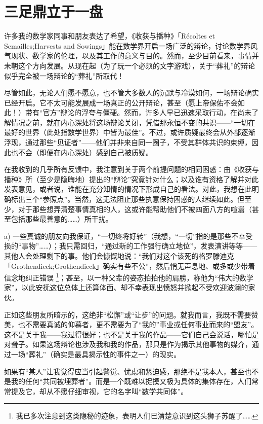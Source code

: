 \section{三足鼎立于一盘}

许多我的数学家同事和朋友表达了希望，《收获与播种》「Récoltes et Semailles;Harvests and Sowings」能在数学界开启一场广泛的辩论，讨论数学界风气现状、数学家的伦理，以及其工作的意义与目的。然而，至少目前看来，事情并未朝这个方向发展。从现在起（为了玩一个必须的文字游戏），关于“葬礼”的辩论似乎完全被一场辩论的“葬礼”所取代！

尽管如此，无论人们愿不愿意，也不管大多数人的沉默与冷漠如何，一场辩论确实已经开启。它不太可能发展成一场真正的公开辩论，甚至（愿上帝保佑不会如此！）带有“官方”辩论的浮夸与僵硬。然而，许多人早已迅速采取行动，在尚未了解情况之前，就在内心深处将这场辩论关闭，凭借那永恒不变的共识——“一切在最好的世界（此处指数学世界）中皆为最佳”。不过，或许质疑最终会从外部逐渐浮现，通过那些“见证者”——他们并非来自同一圈子，不受其群体共识的束缚，因此也不会（即便在内心深处）感到自己被质疑。

在我收到的几乎所有反馈中，我注意到关于两个前提问题的相同困惑：由《收获与播种》所（至少是隐晦地）提出的“辩论”究竟针对什么；以及谁有资格了解并对此发表意见，或者说，谁能在充分知情的情况下形成自己的看法。对此，我想在此明确标出三个“参照点”。当然，这无法阻止那些执意保持困惑的人继续如此。但至少，对于那些想弄清楚事情真相的人，这或许能帮助他们不被四面八方的喧嚣（甚至包括那些最善意的……）所干扰。

a) 一些真诚的朋友向我保证，“一切终将好转”（我想，“一切”指的是那些不幸受损的“事物”……）；我只需回归，“通过新的工作强行确立地位”，发表演讲等等——其他人会处理剩下的事。他们会慷慨地说：“我们对这个该死的格罗滕迪克「Grothendieck;Grothendieck」确实有些不公”，然后悄无声息地、或多或少带着信念地纠正错误 \footnote{我已多次注意到这类隐秘的迹象，表明人们已清楚意识到这头狮子苏醒了……}；甚至，以一种父辈的姿态拍拍他的肩膀，称他为“伟大的数学家”，以此安抚这位总体上还算体面、却不幸表现出愤怒并掀起不受欢迎波澜的家伙。

正如这些朋友所暗示的，这绝非“松懈”或“让步”的问题。就我而言，我既不需要赞美，也不需要真诚的仰慕者，更不需要为了“我的”事业或任何事业而来的“盟友”。这不是关于我——我过得很好；也不是关于我的作品——它们自己会说话，哪怕是对聋子。如果这场辩论也涉及我和我的作品，那只是作为揭示其他事物的媒介，通过一场“葬礼”（确实是最具揭示性的事件之一）的现实。

如果有“某人”让我觉得应当引起警觉、忧虑和紧迫感，那绝不是我本人，甚至也不是我的任何“共同被埋葬者”。而是一个既难以捉摸又极为具体的集体存在，人们常常提及它，却从不愿仔细审视，它的名字叫“数学共同体”。

